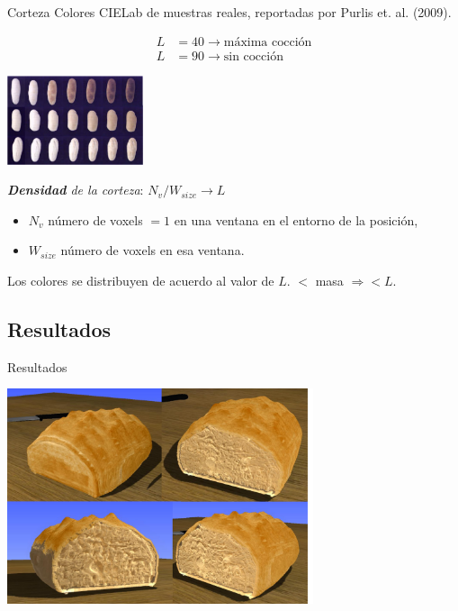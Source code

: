 \documentclass[spanish,unknownkeysallowed,10pt]{beamer}
\begin{document}
\begin{frame}{Corteza}
Colores CIELab de muestras reales, reportadas por Purlis et. al. (2009).

\begin{align*}
L &= 40 \rightarrow \text{máxima cocción}\\
L &= 90 \rightarrow \text{sin cocción}
\end{align*}

\centerline{\includegraphics[width=4cm]{../figures/browning}}


{\em \textbf{Densidad} de la corteza}: $N_{v} / W_{size} \rightarrow L$

\begin{itemize}
\item $N_{v}$ número de voxels $= 1$ en una ventana en el entorno de la posición,
\item $W_{size}$ número de voxels en esa ventana.
\end{itemize}

\vspace{0.2cm}
Los colores se distribuyen de acuerdo al valor de $L$. $<$ masa $\Rightarrow < L$.

\end{frame}


\subsection{Resultados}

\begin{frame}{Resultados}

\centerline{\includegraphics[width=9cm]{../figures/Fig11}}


\end{frame}
\end{document}
